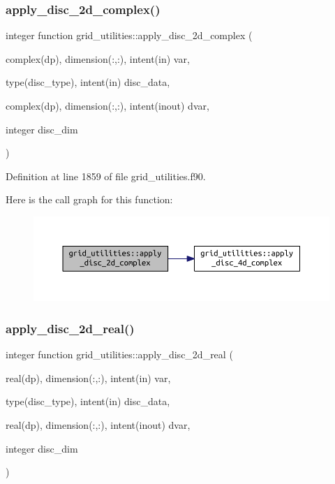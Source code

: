\subsubsection{\texorpdfstring{apply\+\_\+disc\+\_\+2d\+\_\+complex()}{apply\_disc\_2d\_complex()}}
{\footnotesize\ttfamily integer function grid\+\_\+utilities\+::apply\+\_\+disc\+\_\+2d\+\_\+complex (\begin{DoxyParamCaption}\item[{complex(dp), dimension(\+:,\+:), intent(in)}]{var,  }\item[{type(disc\+\_\+type), intent(in)}]{disc\+\_\+data,  }\item[{complex(dp), dimension(\+:,\+:), intent(inout)}]{dvar,  }\item[{integer}]{disc\+\_\+dim }\end{DoxyParamCaption})}



Definition at line 1859 of file grid\+\_\+utilities.\+f90.

Here is the call graph for this function\+:
\nopagebreak
\begin{figure}[H]
\begin{center}
\leavevmode
\includegraphics[width=350pt]{namespacegrid__utilities_a7cb36e1ff9abd22f7f18d8b65215c67f_cgraph}
\end{center}
\end{figure}
\mbox{\label{namespacegrid__utilities_a9ffa0404a239305f4c0c577d1e34a791}} 
\subsubsection{\texorpdfstring{apply\+\_\+disc\+\_\+2d\+\_\+real()}{apply\_disc\_2d\_real()}}
{\footnotesize\ttfamily integer function grid\+\_\+utilities\+::apply\+\_\+disc\+\_\+2d\+\_\+real (\begin{DoxyParamCaption}\item[{real(dp), dimension(\+:,\+:), intent(in)}]{var,  }\item[{type(disc\+\_\+type), intent(in)}]{disc\+\_\+data,  }\item[{real(dp), dimension(\+:,\+:), intent(inout)}]{dvar,  }\item[{integer}]{disc\+\_\+dim }\end{DoxyParamCaption})}



